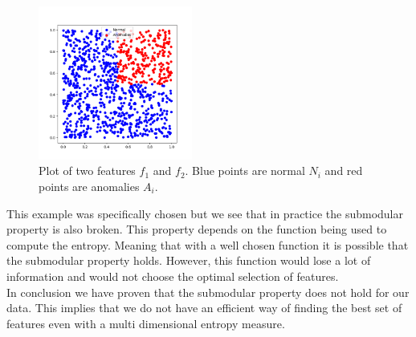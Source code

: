 \documentclass[oneside, a4paper, onecolumn, 11pt]{article}
\begin{document}
\begin{figure}[h]
  \centering
  \includegraphics[width=0.45\textwidth]{images/norm_ano_ex.png}
  \caption{Plot of two features $f_1$ and $f_2$. Blue points are normal $N_i$ and red points are anomalies $A_i$.}
  \label{fig:exstream2dplot}
\end{figure}
This example was specifically chosen but we see that in practice the submodular property is also broken. This property depends on the function being used to compute the entropy. Meaning that with a well chosen function it is possible that the submodular property holds. However, this function would lose a lot of information and would not choose the optimal selection of features.\\
In conclusion we have proven that the submodular property does not hold for our data. This implies that we do not have an efficient way of finding the best set of features even with a multi dimensional entropy measure.\\
\end{document}
